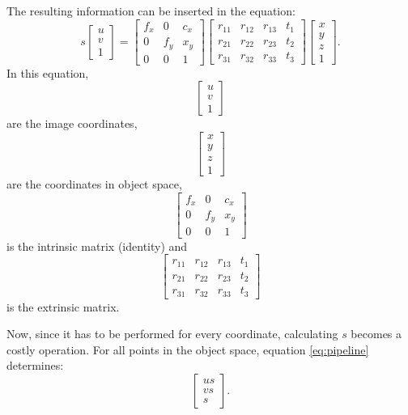 The resulting information can be inserted in the equation:\\
\begin{equation}\label{eq:pipeline}
s \left[ \begin{array}{ccc} 
u\\
v\\
1 \end{array} \right] = 
\left[ \begin{array}{ccc} 
f_{x} & 0 & c_{x}\\
0 & f_{y} & x_{y}\\
0 & 0 & 1 \end{array} \right] 
\left[ \begin{array}{cccc} 
r_{11} & r_{12} & r_{13} & t_{1}\\
r_{21} & r_{22} & r_{23} & t_{2}\\
r_{31} & r_{32} & r_{33} & t_{3} \end{array} \right] 
\left[ \begin{array}{ccc} 
x\\
y\\
z\\
1  \end{array} \right] 
.
\end{equation}
In this equation,
$$
\left[ \begin{array}{ccc} 
u\\
v\\
1 \end{array} \right]
$$
are the image coordinates,
$$
\left[ \begin{array}{ccc} 
x\\
y\\
z\\
1  \end{array} \right] 
$$
are the coordinates in object space,
$$
\left[ \begin{array}{ccc} 
f_{x} & 0 & c_{x}\\
0 & f_{y} & x_{y}\\
0 & 0 & 1 \end{array} \right]
$$
is the intrinsic matrix (identity) and
$$
\left[ \begin{array}{cccc} 
r_{11} & r_{12} & r_{13} & t_{1}\\
r_{21} & r_{22} & r_{23} & t_{2}\\
r_{31} & r_{32} & r_{33} & t_{3}
\end{array} \right]
$$
is the extrinsic matrix.

Now, since it has to be performed for every coordinate, calculating $s$ becomes
a costly operation. For all points in the object space, equation \ref{eq:pipeline} determines:
$$
\left[ \begin{array}{ccc} 
u s\\
v s\\
s \end{array} \right].
$$

